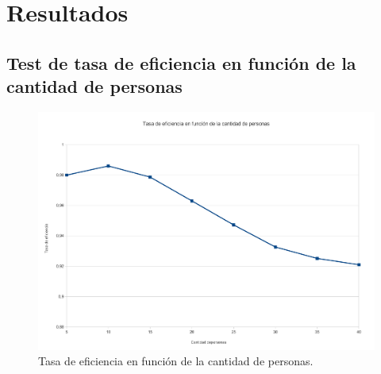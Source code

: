 \section{Resultados}

\subsection{Test de tasa de eficiencia en función de la cantidad de personas}
\begin{figure}[H]{}
\centering
\includegraphics[scale=0.5]{graphs/CPvsTE.pdf}
\caption{Tasa de eficiencia en función de la cantidad de personas.}
\label{CPvsTE}
\end{figure}

